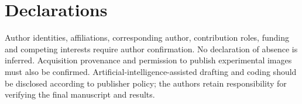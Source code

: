 \documentclass[11pt,a4paper]{article}
\begin{document}
\section*{Declarations}
Author identities, affiliations, corresponding author, contribution roles, funding and competing interests require author confirmation. No declaration of absence is inferred. Acquisition provenance and permission to publish experimental images must also be confirmed. Artificial-intelligence-assisted drafting and coding should be disclosed according to publisher policy; the authors retain responsibility for verifying the final manuscript and results.


\end{document}
